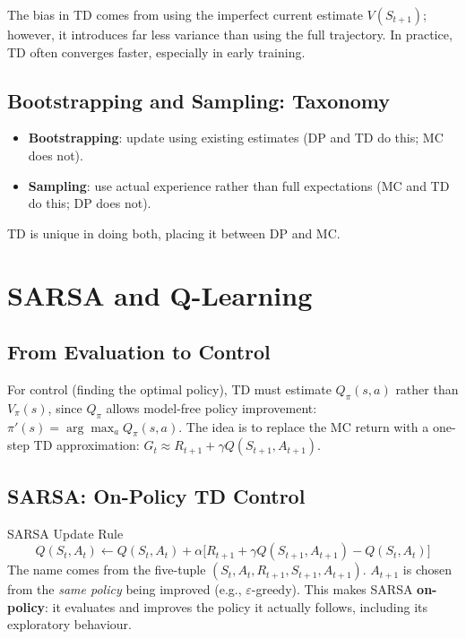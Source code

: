 \documentclass[11pt,a4paper]{article}
\begin{document}
The bias in TD comes from using the imperfect current estimate $V(S_{t+1})$; however, it introduces far less variance than using the full trajectory. In practice, TD often converges faster, especially in early training.

\subsection{Bootstrapping and Sampling: Taxonomy}

\begin{itemize}
  \item \textbf{Bootstrapping}: update using existing estimates (DP and TD do this; MC does not).
  \item \textbf{Sampling}: use actual experience rather than full expectations (MC and TD do this; DP does not).
\end{itemize}
TD is unique in doing both, placing it between DP and MC.

\section{SARSA and Q-Learning}

\subsection{From Evaluation to Control}

For control (finding the optimal policy), TD must estimate $Q_\pi(s,a)$ rather than $V_\pi(s)$, since $Q_\pi$ allows model-free policy improvement: $\pi'(s)=\arg\max_a Q_\pi(s,a)$. The idea is to replace the MC return with a one-step TD approximation: $G_t \approx R_{t+1} + \gamma Q(S_{t+1}, A_{t+1})$.

\subsection{SARSA: On-Policy TD Control}

\begin{defbox}{SARSA Update Rule}
\[
Q(S_t,A_t) \leftarrow Q(S_t,A_t) + \alpha\bigl[R_{t+1} + \gamma Q(S_{t+1},A_{t+1}) - Q(S_t,A_t)\bigr]
\]
The name comes from the five-tuple $(S_t, A_t, R_{t+1}, S_{t+1}, A_{t+1})$. $A_{t+1}$ is chosen from the \emph{same policy} being improved (e.g., $\varepsilon$-greedy). This makes SARSA \textbf{on-policy}: it evaluates and improves the policy it actually follows, including its exploratory behaviour.
\end{defbox}
\end{document}
